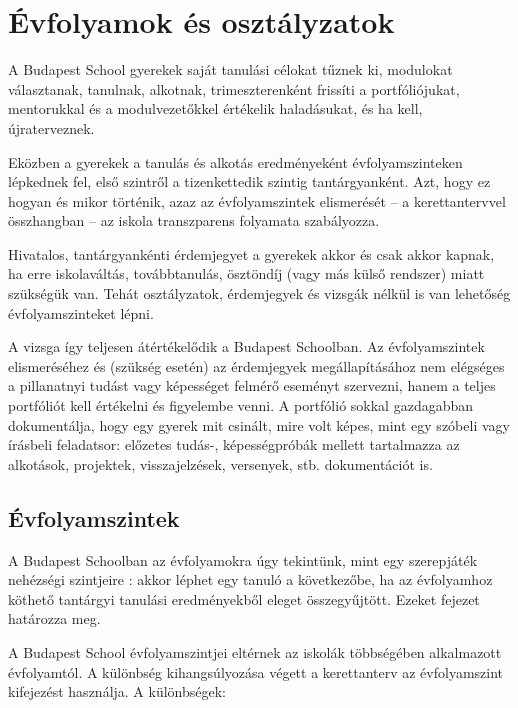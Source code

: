 \section{Évfolyamok és osztályzatok}
\label{sec:evfolyamok_osztalyzatok}
A Budapest School gyerekek saját tanulási célokat tűznek ki, modulokat
választanak, tanulnak, alkotnak, trimeszterenként frissíti a portfóliójukat,
mentorukkal és a modulvezetőkkel értékelik haladásukat, és ha kell,
újraterveznek.

Eközben a gyerekek a tanulás és alkotás eredményeként évfolyamszinteken
lépkednek fel,
első szintről a tizenkettedik szintig tantárgyanként.
Azt, hogy ez hogyan és mikor történik, azaz az évfolyamszintek elismerését -- a
kerettantervvel összhangban -- az iskola transzparens folyamata
szabályozza.

Hivatalos, tantárgyankénti érdemjegyet a gyerekek akkor és csak akkor kapnak,
ha erre iskolaváltás, továbbtanulás, ösztöndíj	    (vagy más külső rendszer)
miatt szükségük van.
Tehát osztályzatok, érdemjegyek és vizsgák nélkül is van lehetőség
évfolyamszinteket lépni.

A vizsga így teljesen átértékelődik a Budapest Schoolban.
Az évfolyamszintek elismeréséhez és (szükség esetén) az érdemjegyek
megállapításához
nem elégséges a pillanatnyi tudást vagy képességet felmérő eseményt szervezni,
hanem
a teljes portfóliót kell értékelni és figyelembe venni.
A portfólió sokkal gazdagabban dokumentálja, hogy egy gyerek mit csinált, mire
volt képes, mint egy szóbeli vagy írásbeli feladatsor: előzetes tudás-,
képességpróbák
mellett tartalmazza az alkotások, projektek, visszajelzések, versenyek, stb.
dokumentációt is.

\subsection{Évfolyamszintek}
\label{sec:evfolyamok}

A Budapest Schoolban az évfolyamokra úgy tekintünk, mint egy szerepjáték
nehézségi
szintjeire \citep{wiki:game_levels}: akkor léphet egy tanuló a következőbe, ha
az
évfolyamhoz köthető tantárgyi tanulási eredményekből eleget összegyűjtött.
Ezeket  fejezet határozza meg.

A Budapest School évfolyamszintjei eltérnek az iskolák többségében alkalmazott
évfolyamtól. A különbség kihangsúlyozása végett a kerettanterv az évfolyamszint
kifejezést használja. A különbségek:

